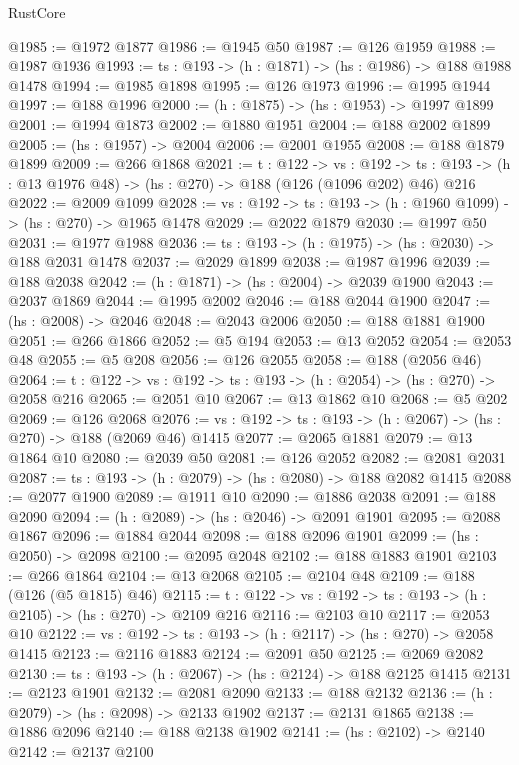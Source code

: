 \begin{lexlean}{RustCore}
\begin{coremodule}
@1985 := @1972 @1877
@1986 := @1945 @50
@1987 := @126 @1959
@1988 := @1987 @1936
@1993 := {ts : @193} -> (h : @1871) -> (hs : @1986) -> @188 @1988 @1478
@1994 := @1985 @1898
@1995 := @126 @1973
@1996 := @1995 @1944
@1997 := @188 @1996
@2000 := (h : @1875) -> (hs : @1953) -> @1997 @1899
@2001 := @1994 @1873
@2002 := @1880 @1951
@2004 := @188 @2002 @1899
@2005 := (hs : @1957) -> @2004
@2006 := @2001 @1955
@2008 := @188 @1879 @1899
@2009 := @266 @1868
@2021 := {t : @122} ->
  {vs : @192} ->
  {ts : @193} -> (h : @13 @1976 @48) -> (hs : @270) -> @188 (@126 (@1096 @202) @46) @216
@2022 := @2009 @1099
@2028 := {vs : @192} -> {ts : @193} -> (h : @1960 @1099) -> (hs : @270) -> @1965 @1478
@2029 := @2022 @1879
@2030 := @1997 @50
@2031 := @1977 @1988
@2036 := {ts : @193} -> (h : @1975) -> (hs : @2030) -> @188 @2031 @1478
@2037 := @2029 @1899
@2038 := @1987 @1996
@2039 := @188 @2038
@2042 := (h : @1871) -> (hs : @2004) -> @2039 @1900
@2043 := @2037 @1869
@2044 := @1995 @2002
@2046 := @188 @2044 @1900
@2047 := (hs : @2008) -> @2046
@2048 := @2043 @2006
@2050 := @188 @1881 @1900
@2051 := @266 @1866
@2052 := @5 @194
@2053 := @13 @2052
@2054 := @2053 @48
@2055 := @5 @208
@2056 := @126 @2055
@2058 := @188 (@2056 @46)
@2064 := {t : @122} -> {vs : @192} -> {ts : @193} -> (h : @2054) -> (hs : @270) -> @2058 @216
@2065 := @2051 @10
@2067 := @13 @1862 @10
@2068 := @5 @202
@2069 := @126 @2068
@2076 := {vs : @192} -> {ts : @193} -> (h : @2067) -> (hs : @270) -> @188 (@2069 @46) @1415
@2077 := @2065 @1881
@2079 := @13 @1864 @10
@2080 := @2039 @50
@2081 := @126 @2052
@2082 := @2081 @2031
@2087 := {ts : @193} -> (h : @2079) -> (hs : @2080) -> @188 @2082 @1415
@2088 := @2077 @1900
@2089 := @1911 @10
@2090 := @1886 @2038
@2091 := @188 @2090
@2094 := (h : @2089) -> (hs : @2046) -> @2091 @1901
@2095 := @2088 @1867
@2096 := @1884 @2044
@2098 := @188 @2096 @1901
@2099 := (hs : @2050) -> @2098
@2100 := @2095 @2048
@2102 := @188 @1883 @1901
@2103 := @266 @1864
@2104 := @13 @2068
@2105 := @2104 @48
@2109 := @188 (@126 (@5 @1815) @46)
@2115 := {t : @122} -> {vs : @192} -> {ts : @193} -> (h : @2105) -> (hs : @270) -> @2109 @216
@2116 := @2103 @10
@2117 := @2053 @10
@2122 := {vs : @192} -> {ts : @193} -> (h : @2117) -> (hs : @270) -> @2058 @1415
@2123 := @2116 @1883
@2124 := @2091 @50
@2125 := @2069 @2082
@2130 := {ts : @193} -> (h : @2067) -> (hs : @2124) -> @188 @2125 @1415
@2131 := @2123 @1901
@2132 := @2081 @2090
@2133 := @188 @2132
@2136 := (h : @2079) -> (hs : @2098) -> @2133 @1902
@2137 := @2131 @1865
@2138 := @1886 @2096
@2140 := @188 @2138 @1902
@2141 := (hs : @2102) -> @2140
@2142 := @2137 @2100

\end{coremodule}
\end{lexlean}
